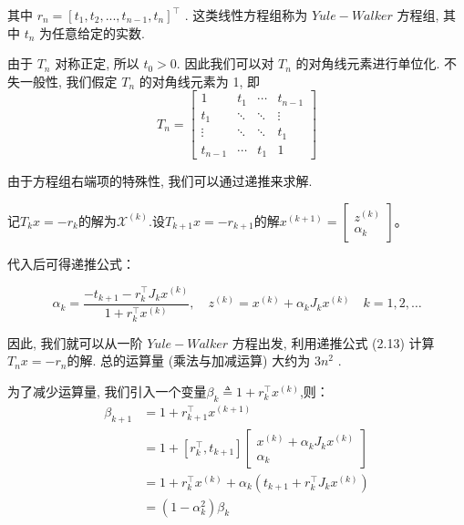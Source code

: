 \documentclass[12pt,a4paper]{article}
\begin{document}
其中 $r_n = [t_1, t_2, . . . , t_{n−1}, t_n]^{\top}$
. 这类线性方程组称为 $Yule-Walker$ 方程组,
其中 $t_n$ 为任意给定的实数.

由于 $T_n$ 对称正定, 所以 $t_0 > 0$. 因此我们可以对 $T_n$ 的对角线元素进行单位化. 不失一般性, 我们假定 $T_n$ 的对角线元素为 1, 即
\begin{equation}
T_{n}=\left[\begin{array}{cccc}{1} & {t_{1}} & {\cdots} & {t_{n-1}} \\ {t_{1}} & {\ddots} & {\ddots} & {\vdots} \\ {\vdots} & {\ddots} & {\ddots} & {t_{1}} \\ {t_{n-1}} & {\cdots} & {t_{1}} & {1}\end{array}\right]
\end{equation}

由于方程组右端项的特殊性, 我们可以通过递推来求解.

记$T_{k} x=-r_{k}$的解为$\mathcal{X}^{(k)}$.设$T_{k+1} x=-r_{k+1}$的解$x^{(k+1)}=\left[\begin{array}{c}{z^{(k)}} \\ {\alpha_{k}}\end{array}\right]$。

代入后可得递推公式：
\begin{framed}
	\begin{equation}
	\alpha_{k}=\frac{-t_{k+1}-r_{k}^{\top} J_{k} x^{(k)}}{1+r_{k}^{\top} x^{(k)}}, \quad z^{(k)}=x^{(k)}+\alpha_{k} J_{k} x^{(k)} \quad k=1,2, \ldots
	\end{equation}
\end{framed}

因此, 我们就可以从一阶 $Yule-Walker$ 方程出发, 利用递推公式 (2.13) 计算
$T_nx = −r_n $的解. 总的运算量 (乘法与加减运算) 大约为 $3n^2$
.

为了减少运算量, 我们引入一个变量$\beta_{k} \triangleq 1+r_{k}^{\top} x^{(k)}$,则：
\begin{equation}
\begin{aligned} \beta_{k+1} &=1+r_{k+1}^{\top} x^{(k+1)} \\ &=1+\left[r_{k}^{\top}, t_{k+1}\right]\left[\begin{array}{c}{x^{(k)}+\alpha_{k} J_{k} x^{(k)}} \\ {\alpha_{k}}\end{array}\right] \\ &=1+r_{k}^{\top} x^{(k)}+\alpha_{k}\left(t_{k+1}+r_{k}^{\top} J_{k} x^{(k)}\right) \\ &=\left(1-\alpha_{k}^{2}\right) \beta_{k} \end{aligned}
\end{equation}
\end{document}
